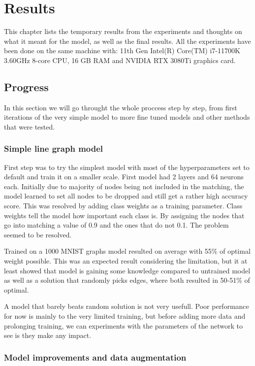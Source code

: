 \chapter{Results}

This chapter lists the temporary results from the experiments and thoughts on what it meant for the model, as well as the final results. All the experiments have been done on the same machine with: 11th Gen Intel(R) Core(TM) i7-11700K 3.60GHz 8-core CPU, 16 GB RAM and NVIDIA RTX 3080Ti graphics card.

\section{Progress}

In this section we will go throught the whole proccess step by step, from first iterations of the very simple model to more fine tuned models and other methods that were tested.

\subsection{Simple line graph model}

First step was to try the simplest model with most of the hyperparameters set to default and train it on a smaller scale. First model had 2 layers and 64 neurons each. Initially due to majority of nodes being not included in the matching, the model learned to set all nodes to be dropped and still get a rather high accuracy score. This was resolved by adding class weights as a training parameter. Class weights tell the model how important each class is. By assigning the nodes that go into matching a value of 0.9 and the ones that do not 0.1. The problem seemed to be resolved.
 
Trained on a 1000 MNIST graphs model resulted on average with 55\% of optimal weight possible. This was an expected result considering the limitation, but it at least showed that model is gaining some knowledge compared to untrained model as well as a solution that randomly picks edges, where both resulted in 50-51\% of optimal. 

A model that barely beats random solution is not very usefull. Poor performance for now is mainly to the very limited training, but before adding more data and prolonging training, we can experiments with the parameters of the network to see is they make any impact.

\subsection{Model improvements and data augmentation}

